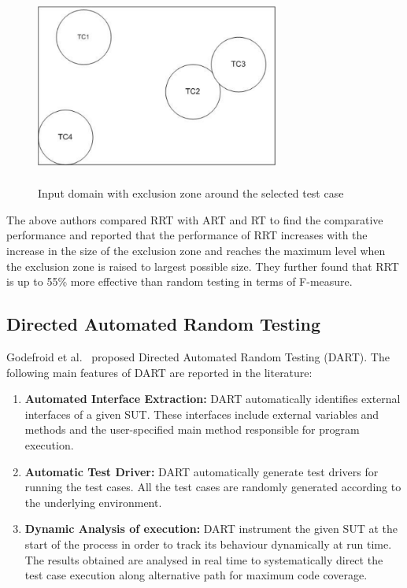 \begin{figure}[h]
	\centering
	\includegraphics[width= 8cm, height = 6.5cm]{chapter3/RRT.pdf}
	\caption{Input domain with exclusion zone around the selected test case}
\end{figure}

The above authors compared RRT with ART and RT to find the comparative performance and reported that the performance of RRT increases with the increase in the size of the exclusion zone and reaches the maximum level when the exclusion zone is raised to largest possible size. %
They further found that RRT is up to 55\% more effective than random testing in terms of F-measure.



\subsection{Directed Automated Random Testing}
Godefroid et al.~\cite{Godefroid2005} proposed Directed Automated Random Testing (DART). %
The following main features of DART are reported in the literature:
\begin{enumerate}
\item {\bf Automated Interface Extraction:} DART automatically identifies external interfaces of a given SUT. These interfaces include external variables and methods and the user-specified main method responsible for program execution.
\item {\bf Automatic Test Driver:} DART automatically generate test drivers for running the test cases. All the test cases are randomly generated according to the underlying environment.
\item {\bf Dynamic Analysis of execution:} DART instrument the given SUT at the start of the process in order to track its behaviour dynamically at run time. The results obtained are analysed in real time to systematically direct the test case execution along alternative path for maximum code coverage.
\end{enumerate}

